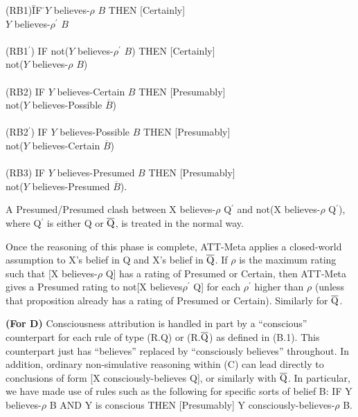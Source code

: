 \begin{tabbing}
(RB1)\quad \=IF \=$Y$ believes-$\rho$ $B$ THEN [Certainly]\\
           \>   \>$Y$ believes-$\rho^\prime$ $B$\\
\\
(RB1$^\prime$) \>IF not($Y$ believes-$\rho^\prime$ $B$) THEN [Certainly]\\
           \>   \>not($Y$ believes-$\rho$ $B$)\\
\\
(RB2)      \>IF $Y$ believes-Certain $B$ THEN [Presumably] \\
           \>   \>not($Y$ believes-Possible $\overline{B}$)\\
\\
(RB2$^\prime$) \>IF $Y$ believes-Possible $B$ THEN [Presumably] \\
           \>   \>not($Y$ believes-Certain $\overline{B}$)\\
\\
(RB3)      \>IF $Y$ believes-Presumed $B$ THEN [Presumably] \\
           \>   \>not($Y$ believes-Presumed $\overline{B}$).
\end{tabbing}

A Presumed/Presumed clash between X believes-$\rho$ Q$^\prime$ and not(X
believes-$\rho$ Q$^\prime$), where Q$^\prime$ is either Q or $\overline{{\rm
Q}}$, is treated in the normal way. 

Once the reasoning of this phase is complete, ATT-Meta applies a closed-world
assumption to X's belief in Q and X's belief in $\overline{{\rm Q}}$.  If
$\rho$ is the maximum rating such that [X believes-$\rho$ Q] has a rating of
Presumed or Certain, then ATT-Meta gives a Presumed rating to not[X
believes$\rho^\prime$ Q] for each $\rho^\prime$ higher than $\rho$ (unless that
proposition already has a rating of Presumed or Certain). Similarly for
$\overline{{\rm Q}}$.


{\bf (For D)} Consciousness attribution is handled in part by a ``conscious''
counterpart for each rule of type (R.Q) or (R.$\overline{{\rm Q}}$) as defined
in (B.1).  This counterpart just has ``believes'' replaced by ``consciously
believes'' throughout. In addition, ordinary non-simulative reasoning within
(C) can lead directly to conclusions of form [X consciously-believes Q], or
similarly with $\overline{{\rm Q}}$. In particular, we have made use of rules
such as the following for specific sorts of belief B: IF Y believes-$\rho$ B
AND Y is conscious THEN [Presumably] Y consciously-believes-$\rho$ B.


